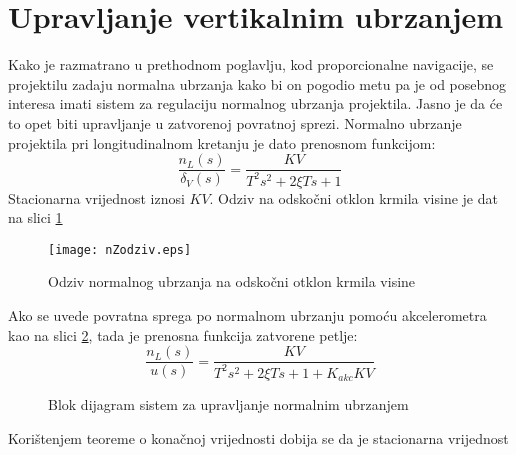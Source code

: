 \section{Upravljanje vertikalnim ubrzanjem}
Kako je razmatrano u prethodnom poglavlju, kod proporcionalne navigacije, se projektilu 
zadaju normalna ubrzanja kako bi on pogodio metu pa je od posebnog interesa imati sistem 
za regulaciju normalnog ubrzanja projektila. Jasno je da će to opet biti upravljanje u 
zatvorenoj povratnoj sprezi. Normalno ubrzanje projektila pri longitudinalnom kretanju 
je dato prenosnom funkcijom:
\begin{equation}
    \frac{n_L(s)}{\delta_V(s)}=\frac{KV}{T^2s^2+2\xi Ts+1}
\end{equation}
Stacionarna vrijednost iznosi $KV$. Odziv na odskočni otklon krmila visine je dat 
na slici \ref{fig:nLodziv}
\begin{figure}[!ht]
    \centering
    \texttt{[image: nZodziv.eps]}
    \caption{Odziv normalnog ubrzanja na odskočni otklon krmila visine}
    \label{fig:nLodziv}
\end{figure}
Ako se uvede povratna sprega po normalnom ubrzanju pomoću akcelerometra kao na slici \ref{fig:akcLoop},
tada je prenosna funkcija zatvorene petlje:
\begin{equation}
    \frac{n_L(s)}{u(s)} = \frac{KV}{T^2s^2+2\xi Ts + 1 +K_{akc}KV}
\end{equation}
\begin{figure}[!ht]
    \centering
    \caption{Blok dijagram sistem za upravljanje normalnim ubrzanjem}
    \label{fig:akcLoop}
\end{figure}
Korištenjem teoreme o konačnoj vrijednosti dobija se da je stacionarna vrijednost 

